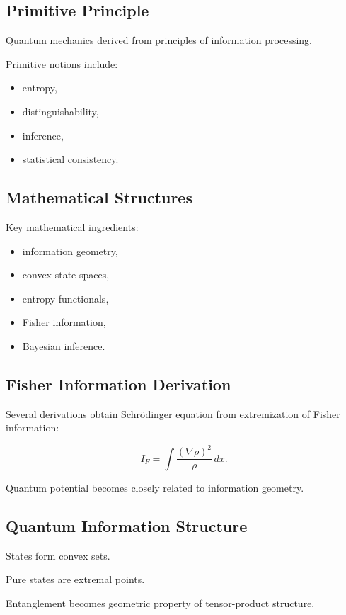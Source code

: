 \documentclass[11pt]{article}
\begin{document}
\subsection{Primitive Principle}

Quantum mechanics derived from principles of information processing.

Primitive notions include:

\begin{itemize}
\item entropy,
\item distinguishability,
\item inference,
\item statistical consistency.
\end{itemize}

\subsection{Mathematical Structures}

Key mathematical ingredients:

\begin{itemize}
\item information geometry,
\item convex state spaces,
\item entropy functionals,
\item Fisher information,
\item Bayesian inference.
\end{itemize}

\subsection{Fisher Information Derivation}

Several derivations obtain Schr\"odinger equation from extremization of Fisher information:

\[
I_F
=
\int
\frac{(\nabla \rho)^2}{\rho}
\,dx.
\]

Quantum potential becomes closely related to information geometry.

\subsection{Quantum Information Structure}

States form convex sets.

Pure states are extremal points.

Entanglement becomes geometric property of tensor-product structure.
\end{document}
